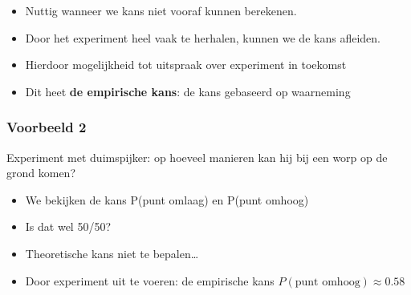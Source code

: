 \documentclass{article}
\begin{document}
\begin{itemize}
    \item Nuttig wanneer we kans niet vooraf kunnen berekenen.
    \item Door het experiment heel vaak te herhalen, kunnen we de kans afleiden.
    \item Hierdoor mogelijkheid tot uitspraak over experiment in toekomst
    \item Dit heet \textbf{de empirische kans}: de kans gebaseerd op waarneming
\end{itemize}

\subsubsection{Voorbeeld 2}

Experiment met duimspijker: op hoeveel manieren kan hij bij een worp op de grond komen?

\begin{itemize}
    \item We bekijken de kans P(punt omlaag) en P(punt omhoog)
    \item Is dat wel 50/50?
    \item Theoretische kans niet te bepalen\dots
    \item Door experiment uit te voeren: de empirische kans $P(\text{punt omhoog}) \approx 0.58$
\end{itemize}
\end{document}
